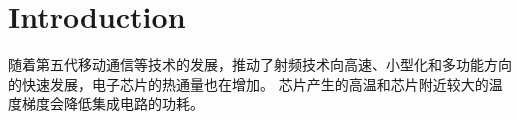 %
% 
%

\section{Introduction}

随着第五代移动通信等技术的发展\cite{Lau_2022}，推动了射频技术向高速、小型化和多功能方向的快速发展，电子芯片的热通量也在增加。
\Nomenclature
芯片产生的高温和芯片附近较大的温度梯度会降低集成电路的功耗。